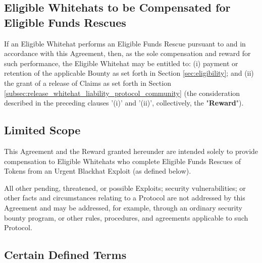 \documentclass{article}
\begin{document}
\subsection{Eligible Whitehats to be Compensated for Eligible Funds Rescues}\label{subsec:compensation}

If an Eligible Whitehat performs an Eligible Funds Rescue pursuant to and in accordance with this Agreement, then, as the sole compensation and reward for such performance, the Eligible Whitehat may be entitled to: (i) payment or retention of the applicable Bounty as set forth in Section \ref{sec:eligibility}; and (ii) the grant of a release of Claims as set forth in Section \ref{subsec:release_whitehat_liability_protocol_community} (the consideration described in the preceding clauses '(i)' and '(ii)', collectively, the "\textbf{Reward}").

\subsection{Limited Scope}\label{subsec:limited_scope}

This Agreement and the Reward granted hereunder are intended solely to provide compensation to Eligible Whitehats who complete Eligible Funds Rescues of Tokens from an Urgent Blackhat Exploit (as defined below).

All other pending, threatened, or possible Exploits; security vulnerabilities; or other facts and circumstances relating to a Protocol are not addressed by this Agreement and may be addressed, for example, through an ordinary security bounty program, or other rules, procedures, and agreements applicable to such Protocol.

\subsection{Certain Defined Terms}\label{subsec:defined_terms_2}
\end{document}
